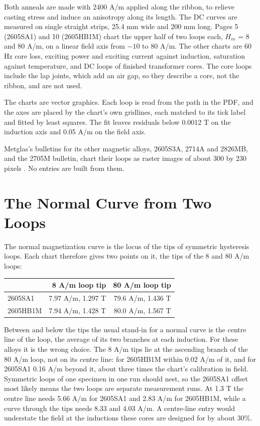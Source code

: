 \documentclass[
  11pt,
]{article}
\begin{document}
Both anneals are made with 2400 A/m applied along the ribbon, to relieve casting stress and induce an anisotropy along its length. The DC curves are measured on single straight strips, 25.4 mm wide and 200 mm long. Pages 5 (2605SA1) and 10 (2605HB1M) chart the upper half of two loops each, \(H_m\) = 8 and 80 A/m, on a linear field axis from \(-10\) to 80 A/m. The other charts are 60 Hz core loss, exciting power and exciting current against induction, saturation against temperature, and DC loops of finished transformer cores. The core loops include the lap joints, which add an air gap, so they describe a core, not the ribbon, and are not used.

The charts are vector graphics. Each loop is read from the path in the PDF, and the axes are placed by the chart's own gridlines, each matched to its tick label and fitted by least squares. The fit leaves residuals below 0.0012 T on the induction axis and 0.05 A/m on the field axis.

Metglas's bulletins for its other magnetic alloys, 2605S3A, 2714A and 2826MB, and the 2705M bulletin, chart their loops as raster images of about 300 by 230 pixels \cite{metglas-bulletins}. No entries are built from them.

\section{The Normal Curve from Two Loops}\label{the-normal-curve}

The normal magnetization curve is the locus of the tips of symmetric hysteresis loops. Each chart therefore gives two points on it, the tips of the 8 and 80 A/m loops:

\begin{center}
\begin{tabular}{lrr}
\toprule
& 8 A/m loop tip & 80 A/m loop tip \\
\midrule
2605SA1 & 7.97 A/m, 1.297 T & 79.6 A/m, 1.436 T \\
2605HB1M & 7.94 A/m, 1.428 T & 80.0 A/m, 1.567 T \\
\bottomrule
\end{tabular}
\end{center}

Between and below the tips the usual stand-in for a normal curve is the centre line of the loop, the average of its two branches at each induction. For these alloys it is the wrong choice. The 8 A/m tips lie at the ascending branch of the 80 A/m loop, not on its centre line: for 2605HB1M within 0.02 A/m of it, and for 2605SA1 0.16 A/m beyond it, about three times the chart's calibration in field. Symmetric loops of one specimen in one run should nest, so the 2605SA1 offset most likely means the two loops are separate measurement runs. At 1.3 T the centre line needs 5.66 A/m for 2605SA1 and 2.83 A/m for 2605HB1M, while a curve through the tips needs 8.33 and 4.03 A/m. A centre-line entry would understate the field at the inductions these cores are designed for by about 30\%.
\end{document}
